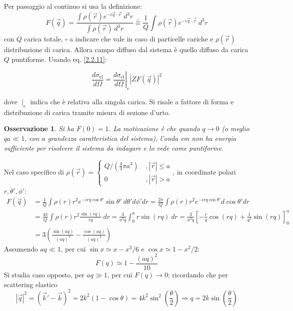 \documentclass[10pt, a4paper]{scrartcl}
\newcommand*\Eval[3]{\left.#1\right\rvert_{#2}^{#3}}
\numberwithin{equation}{subsection}
\theoremstyle{style1}
\newtheorem{osservazione}{Osservazione}[section]
\newenvironment{boxenv}[1][]{
    \begin{eqbox}[#1]
    }{
   \end{eqbox}
}
\begin{document}
Per passaggio al continuo si usa la definizione:
\[
F(\vec{q}) = \frac{\int \rho (\vec{r}) e^{-i\vec{q}\cdot \vec{r}} \ d^3 r}{\int \rho (\vec{r}) \ d^3 r} \stackrel{\square}{\equiv} \frac{1}{Q}\int \rho (\vec{r}) e^{-i\vec{q}\cdot \vec{r}} \ d^3 r
\] 
con $Q$ carica totale, $\square$ a indicare che vale in caso di particelle cariche e $\rho (\vec{r})$ distribuzione di carica. Allora campo diffuso dal sistema \`e quello diffuso da carica $Q$ puntiforme. Usando eq. \ref{2.2.11}:
\begin{boxenv}[]
\begin{equation}
	\frac{d \sigma _\text{el}}{d \Omega } = \Eval{\frac{d \sigma _\text{el}}{d \Omega } }{e}{} \left\lvert Z F(\vec{q}) \right\rvert ^2
\end{equation}
\end{boxenv}
\noindent dove $ \mid _e$ indica che \`e relativa alla singola carica. Si risale a fattore di forma e distribuzione di carica tramite misura di sezione d'urto. 
\begin{osservazione}
	Si ha $F(0) = 1$. La motivazione \`e che quando $q\to 0$ (o meglio $qa\ll 1$, con $a$ grandezza caratteristica del sistema), l'onda em non ha energia sufficiente per risolvere il sistema da indagare e lo vede come puntiforme.
\end{osservazione}
\noindent Nel caso specifico di $\rho (\vec{r}) = \begin{cases}
	Q / (\frac{4}{3} \pi a^3)\ &,  |\vec{r}| \le  a\\ 0 \ & , |\vec{r}| > a
\end{cases}$, in coordinate polari $r, \theta ',\phi '$:
\[
\begin{split}
	F(\vec{q}) &= \frac{1}{Q} \int \rho (r) r^2 e^{-irq \cos \theta '} \sin \theta ' \ d\theta ' d\phi ' dr = \frac{2\pi}{Q} \int \rho (r) r^2 e^{-irq \cos \theta '} d\cos\theta ' dr \\
		   &= \frac{4\pi}{Q} \int \rho (r) r^2 \frac{\sin(rq)}{rq} \ dr = \frac{3}{a^3 q} \int_{0} ^a r \sin(rq) \ dr = \frac{3}{a^3 q} \left[ -\frac{r}{q} \cos(rq) + \frac{1}{q^2} \sin(rq) \right] _{0} ^a \\
		   &= 3 \left(\frac{\sin(aq)}{(aq)^3} - \frac{\cos(aq)}{(aq)^2}\right) 
\end{split}
\] 
Assumendo $aq\ll 1 $, per cui $\sin x \simeq x - x^3 / 6$ e $\cos x \simeq 1 - x^2 / 2$:
\[
F(q) \simeq 1 - \frac{(aq)^2}{10}
\] 
Si studia caso opposto, per $aq \gg 1$, per cui $F(q)\to 0$; ricordando che per scattering elastico
\[
 |\vec{q}|^2 = (\vec{k}' - \vec{k})^2 = 2k^2 (1-\cos\theta ) = 4 k^2 \sin^2 \left(\frac{\theta}{2}\right) \Rightarrow q = 2 k \sin\left(\frac{\theta}{2}\right) 
\] 
\end{document}

